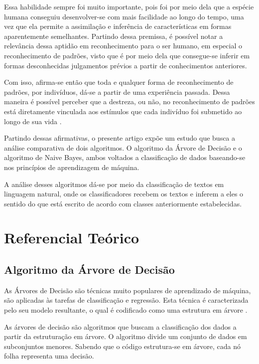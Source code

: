 \documentclass[preprint,12pt,times]{elsarticle}
\begin{document}
	Essa habilidade sempre foi muito importante, pois foi por meio dela que a espécie humana conseguiu desenvolver-se com mais facilidade ao longo do tempo, uma vez que ela permite a assimilação e inferência de características em formas aparentemente semelhantes. Partindo dessa premissa, é possível notar a relevância dessa aptidão em reconhecimento para o ser humano, em especial o reconhecimento de padrões, visto que é por meio dela que consegue-se inferir em formas desconhecidas julgamentos prévios a partir de conhecimentos anteriores.

	Com isso, afirma-se então que toda e qualquer forma de reconhecimento de padrões, por indivíduos, dá-se a partir de uma experiência passada. Dessa maneira é possível perceber que a destreza, ou não, no reconhecimento de padrões está diretamente vinculada aos estímulos que cada indivíduo foi submetido ao longo de sua vida \cite{Prado:2008}.

	Partindo dessas afirmativas, o presente artigo expõe um estudo que busca a análise comparativa de dois algoritmos. O algoritmo da Árvore de Decisão e o algoritmo de Naive Bayes, ambos voltados a classificação de dados baseando-se nos princípios de aprendizagem de máquina. 
	
	A análise desses algoritmos dá-se por meio da classificação de textos em linguagem natural, onde os classificadores recebem os textos e inferem a eles o sentido do que está escrito de acordo com classes anteriormente estabelecidas.
	

	\section{Referencial Teórico}
	\label{Referencial Teórico}

	\subsection{Algoritmo da Árvore de Decisão}

	As  Árvores de Decisão são técnicas muito populares de aprendizado de máquina, são aplicadas às tarefas de classificação e regressão. Esta técnica é caracterizada pelo seu modelo resultante, o qual é codificado como uma estrutura em árvore \cite{Nuti:2019}.

	As árvores de decisão são algoritmos que buscam a classificação dos dados a partir da estruturação em árvore. O algoritmo divide um conjunto de dados em subconjuntos menores. Sabendo que o código estrutura-se em árvore, cada nó folha representa uma decisão.
\end{document}
